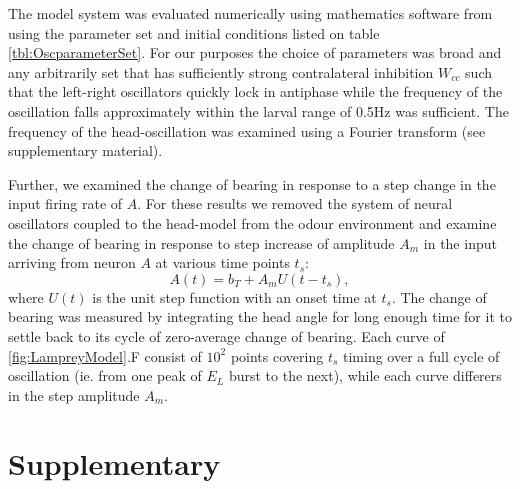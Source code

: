 \documentclass[10pt,a4paper]{article}
\begin{document}
The model system was evaluated numerically using mathematics software from \cite{math}
using the parameter set and initial conditions listed on table \ref{tbl:OscparameterSet}.
 For our purposes the choice of parameters was broad and any arbitrarily set that has sufficiently strong contralateral inhibition $W_{cc}$ such that the left-right oscillators quickly lock in antiphase while the frequency of the oscillation falls approximately within the larval range of 0.5Hz was sufficient. The frequency of the head-oscillation was examined using a Fourier transform (see supplementary material).

Further, we examined the change of bearing in response to a step change in the input firing rate of $A$. For these results we removed the system of neural oscillators coupled to the head-model from the odour environment and examine the change of bearing in response to step increase of amplitude $A_m$ in the input arriving from neuron $A$ at various time points $t_s$:
\begin{equation}
A(t) = b_T + A_m U(t-t_s),
\end{equation}
where $U(t)$ is the unit step function with an onset time at $t_s$. The change of bearing was measured by integrating the head angle for long enough time for it to settle back to its cycle of zero-average change of bearing. Each curve of \ref{fig:LampreyModel}.F consist of $10^2$ points covering $t_s$ timing over a full cycle of oscillation (ie. from one peak of $E_L$ burst to the next), while each curve differers in the step amplitude $A_m$.

\section{Supplementary}
\end{document}
